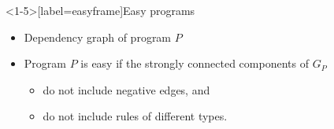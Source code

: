 

\begin{frame}<1-5>[label=easyframe]{Easy programs}
  \begin{itemize}
    \item \alert<1>{Dependency graph} of program $P$
      \begin{itemize}
      \end{itemize}
    \pause
    \item Program $P$ is \alert<2>{easy} if the strongly connected components of $G_P$ 
     \begin{itemize}
       \item do not include negative edges, and
       \item do not include rules of different types.
     \end{itemize} 



\end{itemize}
\end{frame}
